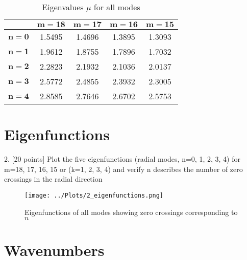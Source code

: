 \documentclass[]{aiaa-tc}%
\begin{document}
\begin{table}[htb]
\begin{centering}
\begin{tabular}{| c | c c c c |}
\hline
{} &  $\mathbf{m=18}$ &  $\mathbf{m=17}$ &  $\mathbf{m=16}$ &  $\mathbf{m=15}$ \\
\hline
$\mathbf{n=0}$ &       1.5495 &         1.4696 &         1.3895 &         1.3093 \\
$\mathbf{n=1}$ &       1.9612 &         1.8755 &         1.7896 &         1.7032 \\
$\mathbf{n=2}$ &       2.2823 &         2.1932 &         2.1036 &         2.0137 \\
$\mathbf{n=3}$ &       2.5772 &         2.4855 &         2.3932 &         2.3005 \\
$\mathbf{n=4}$ &       2.8585 &         2.7646 &         2.6702 &         2.5753 \\
\hline
\end{tabular}
\caption{Eigenvalues $\mu$ for all modes}
\end{centering}
\end{table}

\clearpage

\section{Eigenfunctions}

2. [20 points] Plot the five eigenfunctions (radial modes, n=0, 1, 2, 3, 4) for m=18, 17, 16, 15 or (k=1, 2, 3, 4) and verify n describes the number of zero crossings in the radial direction


\begin{figure}[htb!]
\begin{center}
\texttt{[image: ../Plots/2\_eigenfunctions.png]}
\caption{Eigenfunctions of all modes showing zero crossings corresponding to $n$}
\label{eigenfuncs}
\end{center}
\end{figure}

\section{Wavenumbers}
\end{document}
